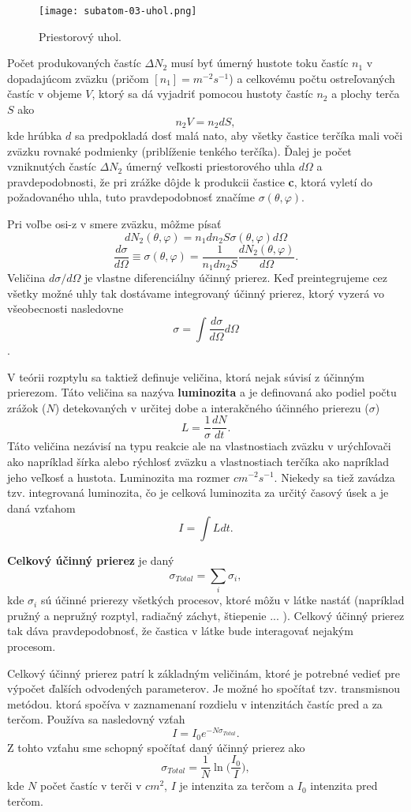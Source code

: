 \documentclass[../../main.tex]{subfiles}
\begin{document}
\begin{figure}[!h]
\texttt{[image: subatom-03-uhol.png]}
\centering
\caption{Priestorový uhol.}
\label{sf3:fig:uhol}
\end{figure}

Počet produkovaných častíc $\Delta N_2$ musí byť úmerný hustote toku častíc $n_1$ v dopadajúcom zväzku (pričom $[n_1]=m^{-2}s^{-1}$) a celkovému počtu ostreľovaných častíc v objeme $V$, ktorý sa dá vyjadriť pomocou hustoty častíc $n_2$ a plochy terča $S$ ako
$$ n_2V = n_2dS,$$
kde hrúbka $d$ sa predpokladá dosť malá nato, aby všetky častice terčíka mali voči zväzku rovnaké podmienky (priblíženie tenkého terčíka). Ďalej je počet vzniknutých častíc $\Delta N_2$ úmerný veľkosti priestorového uhla $d\Omega$ a pravdepodobnosti, že pri zrážke dôjde k produkcii častice \textbf{c}, ktorá vyletí do požadovaného uhla, tuto pravdepodobnosť značíme $\sigma(\theta, \varphi)$.

Pri voľbe osi-z v smere zväzku, môžme písať
$$ dN_2(\theta, \varphi) = n_1dn_2S \sigma(\theta, \varphi)d\Omega $$ 
$$ \frac{d\sigma}{d\Omega} \equiv \sigma(\theta, \varphi) = \frac{1}{n_1dn_2S}\frac{dN_2(\theta, \varphi)}{d\Omega}. $$
Veličina $d\sigma/d\Omega$ je vlastne diferenciálny účinný prierez. Keď preintegrujeme cez všetky možné uhly tak dostávame integrovaný účinný prierez, ktorý vyzerá vo všeobecnosti nasledovne
$$ \sigma = \int \frac{d\sigma}{d\Omega}d\Omega $$.

V teórii rozptylu sa taktiež definuje veličina, ktorá nejak súvisí z účinným prierezom. Táto veličina sa nazýva \textbf{luminozita} a je definovaná ako podiel počtu zrážok ($N$) detekovaných v určitej dobe a interakčného účinného prierezu ($\sigma$)
$$ L = \frac{1}{\sigma} \frac{dN}{dt}.$$
Táto veličina nezávisí na typu reakcie ale na vlastnostiach zväzku v urýchľovači ako napríklad šírka alebo rýchlosť zväzku a vlastnostiach terčíka ako napríklad jeho veľkosť a hustota. Luminozita ma rozmer $cm^{-2}s^{-1}$. Niekedy sa tiež zavádza tzv. integrovaná luminozita, čo je celková luminozita za určitý časový úsek a je daná vzťahom 
$$ I = \int L dt.$$

\textbf{Celkový účinný prierez} je daný 
$$ \sigma_{Total} = \sum_i \sigma_i,$$
kde $\sigma_i$ sú účinné prierezy všetkých procesov, ktoré môžu v látke nastáť (napríklad pružný a nepružný rozptyl, radiačný záchyt, štiepenie ... ). Celkový účinný prierez tak dáva pravdepodobnosť, že častica v látke bude interagovať nejakým procesom.

Celkový účinný prierez patrí k základným veličinám, ktoré je potrebné vedieť pre výpočet ďalších odvodených parameterov. Je možné ho spočítať tzv. transmisnou metódou. ktorá spočíva v zaznamenaní rozdielu v intenzitách častíc pred a za terčom. Používa sa nasledovný vzťah
$$ I = I_0e^{-N\sigma_{Total}}.$$
Z tohto vzťahu sme schopný spočítať daný účinný prierez ako
$$ \sigma_{Total} = \frac{1}{N}\ln \bigg( \frac{I_0}{I} \bigg),$$
kde $N$ počet častíc v terči v $cm^2$, $I$ je intenzita za terčom a $I_0$ intenzita pred terčom.
\end{document}
